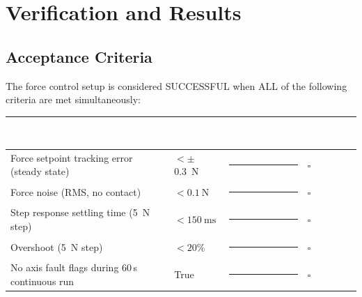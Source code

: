
\section{Verification and Results}
\label{sec:verification}


\subsection{Acceptance Criteria}
\label{sec:verif:criteria}

The force control setup is considered SUCCESSFUL when ALL of the following
criteria are met simultaneously:

\begin{center}
\begin{tabularx}{\textwidth}{@{} X l l l @{}}
  \toprule
  \rowcolor{PBATableHeader}
  \textcolor{white}{\bfseries Parameter} &
  \textcolor{white}{\bfseries Criterion} &
  \textcolor{white}{\bfseries Measured value} &
  \textcolor{white}{\bfseries Pass / Fail} \\
  \midrule
  Force setpoint tracking error (steady state) &
    $< \pm$\SI{0.3}{\newton} & \rule{1.5cm}{0.4pt} & $\square$ \\
  \rowcolor{PBALightGray}
  Force noise (RMS, no contact) &
    $< \SI{0.1}{\newton}$ & \rule{1.5cm}{0.4pt} & $\square$ \\
  Step response settling time (\SI{5}{\newton} step) &
    $< \SI{150}{\milli\second}$ & \rule{1.5cm}{0.4pt} & $\square$ \\
  \rowcolor{PBALightGray}
  Overshoot (\SI{5}{\newton} step) &
    $< 20\%$ & \rule{1.5cm}{0.4pt} & $\square$ \\
  No axis fault flags during 60\,s continuous run &
    True & \rule{1.5cm}{0.4pt} & $\square$ \\
  \bottomrule
\end{tabularx}
\end{center}

